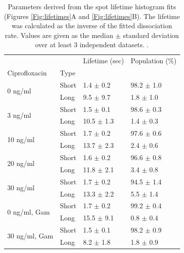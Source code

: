 \begin{table}[htbp]
    \centering
    \caption{Parameters derived from the spot lifetime histogram fits (Figures \ref{Fig:lifetimes}A and \ref{Fig:lifetimes}B). The lifetime was calculated as the inverse of the fitted dissociation rate. Values are given as the median $\pm$ standard deviation over at least 3 independent datasets. . }
    \begin{tabular}{llll}
        \toprule
         &  & Lifetime (sec) & Population (\%) \\
        Ciprofloxacin & Type &  &  \\
        \midrule
        \multirow[t]{2}{*}{0 ng/ml} & Short & 1.4 $\pm$ 0.2 & 98.2 $\pm$ 1.0 \\
         & Long & 9.5 $\pm$ 9.7 & 1.8 $\pm$ 1.0 \\
        \cline{1-4}
        \multirow[t]{2}{*}{3 ng/ml} & Short & 1.5 $\pm$ 0.1 & 98.6 $\pm$ 0.3 \\
         & Long & 10.5 $\pm$ 1.3 & 1.4 $\pm$ 0.3 \\
        \cline{1-4}
        \multirow[t]{2}{*}{10 ng/ml} & Short & 1.7 $\pm$ 0.2 & 97.6 $\pm$ 0.6 \\
         & Long & 13.7 $\pm$ 2.3 & 2.4 $\pm$ 0.6 \\
        \cline{1-4}
        \multirow[t]{2}{*}{20 ng/ml} & Short & 1.6 $\pm$ 0.2 & 96.6 $\pm$ 0.8 \\
         & Long & 11.8 $\pm$ 2.1 & 3.4 $\pm$ 0.8 \\
        \cline{1-4}
        \multirow[t]{2}{*}{30 ng/ml} & Short & 1.7 $\pm$ 0.2 & 94.5 $\pm$ 1.4 \\
         & Long & 13.3 $\pm$ 2.2 & 5.5 $\pm$ 1.4 \\
        \cline{1-4}
        \midrule
        \multirow[t]{2}{*}{0 ng/ml, Gam} & Short & 1.7 $\pm$ 0.2 & 99.2 $\pm$ 0.4 \\
         & Long & 15.5 $\pm$ 9.1 & 0.8 $\pm$ 0.4 \\
        \cline{1-4}
        \multirow[t]{2}{*}{30 ng/ml, Gam} & Short & 1.5 $\pm$ 0.1 & 98.2 $\pm$ 0.9 \\
        & Long & 8.2 $\pm$ 1.8 & 1.8 $\pm$ 0.9 \\
        \bottomrule
        \end{tabular}
    \label{tab:fit_results}
\end{table}

